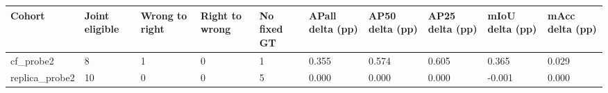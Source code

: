 \begin{tabular}{llllllllll}
\toprule
Cohort & Joint eligible & Wrong to right & Right to wrong & No fixed GT & APall delta (pp) & AP50 delta (pp) & AP25 delta (pp) & mIoU delta (pp) & mAcc delta (pp) \\
\midrule
cf\_probe2 & 8 & 1 & 0 & 1 & 0.355 & 0.574 & 0.605 & 0.365 & 0.029 \\
replica\_probe2 & 10 & 0 & 0 & 5 & 0.000 & 0.000 & 0.000 & -0.001 & 0.000 \\
\bottomrule
\end{tabular}
